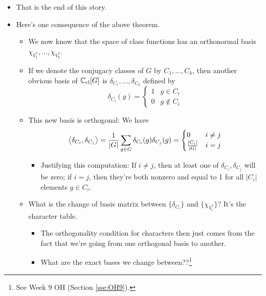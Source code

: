 \documentclass[../notes.tex]{subfiles}
\begin{document}
\begin{itemize}
\begin{proof}
\begin{equation*}
            0 = \sum_{g\in G}f(g)\cdot e_g
        \end{equation*}
        But since the $e_g$ are all linearly independent by the definition of the regular representation, we have that each $f(g)=0$, as desired. This means that $f=0$, contradicting our original supposition.
    \end{proof}
    \item That is the end of this story.
    \item Here's one consequence of the above theorem.
    \begin{itemize}
        \item We now know that the space of class functions has an orthonormal basis $\chi_{V_1^*},\dots,\chi_{V_k^*}$.
        \item If we denote the conjugacy classes of $G$ by $C_1,\dots,C_k$, then another obvious basis of $\mathbb{C}_\text{cl}[G]$ is $\delta_{C_1},\dots,\delta_{C_k}$ defined by
        \begin{equation*}
            \delta_{C_i}(g) =
            \begin{cases}
                1 & g\in C_i\\
                0 & g\notin C_i
            \end{cases}
        \end{equation*}
        \item This new basis is orthogonal: We have
        \begin{equation*}
            \left\langle{\delta_{C_i},\delta_{C_j}}\right\rangle = \frac{1}{|G|}\sum_{g\in G}\delta_{C_i}(g)\delta_{C_j}(g) =
            \begin{cases}
                0 & i\neq j\\
                \frac{|C_i|}{|G|} & i=j
            \end{cases}
        \end{equation*}
        \begin{itemize}
            \item Justifying this computation: If $i\neq j$, then at least one of $\delta_{C_i},\delta_{C_j}$ will be zero; if $i=j$, then they're both nonzero and equal to 1 for all $|C_i|$ elements $g\in C_i$.
        \end{itemize}
        \item What is the change of basis matrix between $\{\delta_{C_i}\}$ and $\{\chi_{V_i^*}\}$? It's the character table.
        \begin{itemize}
            \item The orthogonality condition for characters then just comes from the fact that we're going from one orthogonal basis to another.
            \item What are the exact bases we change between??\footnote{See Week 9 OH (Section \ref{sse:OH9}).}
        \end{itemize}
    \end{itemize}
\end{itemize}
\end{document}
